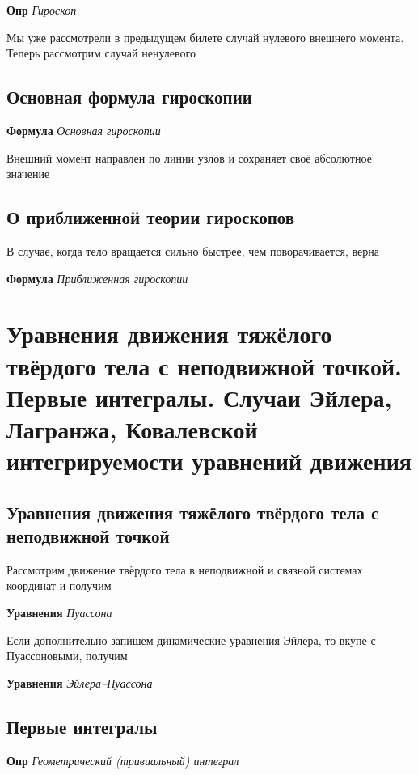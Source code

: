 \documentclass[a4paper, 14pt]{article}
\begin{document}
    \textbf{Опр} \textit{Гироскоп}
    
    Мы уже рассмотрели в предыдущем билете случай нулевого внешнего момента.
    Теперь рассмотрим случай ненулевого
    
    \subsection{Основная формула гироскопии}
    
    \textbf{Формула} \textit{Основная гироскопии}
    
    Внешний момент направлен по линии узлов и сохраняет своё абсолютное значение
    
    \subsection{О приближенной теории гироскопов}
    
    В случае, когда тело вращается сильно быстрее, чем поворачивается, верна
    
    \textbf{Формула} \textit{Приближенная гироскопии}
    
    \section{Уравнения движения тяжёлого твёрдого тела с неподвижной точкой.
    Первые интегралы.
    Случаи Эйлера, Лагранжа, Ковалевской интегрируемости уравнений движения}
    
    \subsection{Уравнения движения тяжёлого твёрдого тела с неподвижной точкой}
    
    Рассмотрим движение твёрдого тела в неподвижной и связной системах координат и получим
    
    \textbf{Уравнения} \textit{Пуассона}
    
    Если дополнительно запишем динамические уравнения Эйлера, то вкупе с Пуассоновыми, получим
    
    \textbf{Уравнения} \textit{Эйлера--Пуассона}
    
    \subsection{Первые интегралы}
    
    \textbf{Опр} \textit{Геометрический (тривиальный) интеграл}
    
\end{document}
